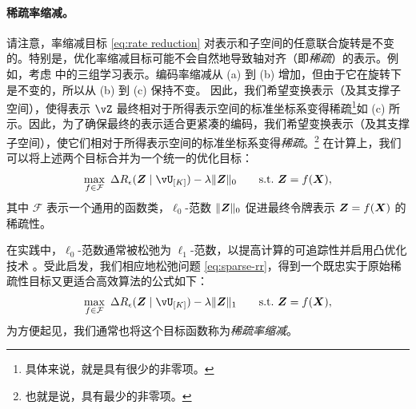 \documentclass[../../book-main.tex]{subfiles}
\begin{document}
\paragraph{稀疏率缩减。} 请注意，率缩减目标 \eqref{eq:rate reduction} 对表示和子空间的任意联合旋转是不变的。特别是，优化率缩减目标可能不会自然地导致轴对齐（即\textit{稀疏}）的表示。{例如，考虑  中的三组学习表示。编码率缩减从 (a) 到 (b) 增加，但由于它在旋转下是不变的，所以从 (b) 到 (c) 保持不变。} 因此，我们希望变换表示（及其支撑子空间），使得表示 $\vZ$ 最终相对于所得表示空间的标准坐标系变得稀疏\footnote{具体来说，就是具有很少的非零项。}{如 (c) 所示}。因此，为了确保最终的表示适合更紧凑的编码，我们希望变换表示（及其支撑子空间），使它们相对于所得表示空间的标准坐标系变得\textit{稀疏}。\footnote{也就是说，具有最少的非零项。} 在计算上，我们可以将上述两个目标合并为一个统一的优化目标：
\begin{equation}
   \max_{f \in \mathcal{F}}\ \Delta R_{\epsilon}(\Z \mid \vU_{[K]}) - \lambda \|\bm{Z}\|_0 \qquad \text{s.t.}\ \Z = f(\X),
   \label{eq:sparse-rr}
\end{equation}
其中 $\mathcal{F}$ 表示一个通用的函数类，$\ell_0$-范数 $\|\bm{Z}\|_0$ 促进最终令牌表示 \(\bm{Z} = f(\bm{X})\) 的稀疏性。%


在实践中，$\ell_0$-范数通常被松弛为 $\ell_1$-范数，以提高计算的可追踪性并启用凸优化技术 \cite{Wright-Ma-2022}。受此启发，我们相应地松弛问题 \eqref{eq:sparse-rr}，得到一个既忠实于原始稀疏性目标又更适合高效算法的公式如下：
\begin{equation}
\begin{aligned}
   \max_{f \in \mathcal{F}}\    \Delta R_{\epsilon}(\Z \mid \vU_{[K]}) - \lambda \|\bm{Z}\|_1  \qquad \text{s.t.}\ \Z = f(\X),
   \label{eq:sparse-rr-1}
\end{aligned}
\end{equation}
为方便起见，我们通常也将这个目标函数称为\textit{稀疏率缩减}。
\end{document}
